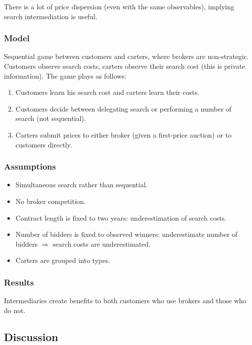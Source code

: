 There is a lot of price dispersion (even with the same observables), implying search intermediation is useful.

\subsubsection{Model}

Sequential game between customers and carters, where brokers are non-strategic. Customers observe search costs, carters observe their search cost (this is private information). The game plays as follows:\begin{enumerate}
\item Customers learn his search cost and carters learn their costs.
\item Customers decide between delegating search or performing a number of search (not sequential).
\item Carters submit prices to either broker (given a first-price auction) or to customers directly.
\end{enumerate}

\subsubsection{Assumptions}

\begin{itemize}
\item Simultaneous search rather than sequential.
\item No broker competition.
\item Contract length is fixed to two years: underestimation of search costs.
\item Number of bidders is fixed to observed winners: underestimate number of bidders $\Rightarrow$ search costs are underestimated.
\item Carters are grouped into types.
\end{itemize}

\subsubsection{Results}

Intermediaries create benefits to both customers who use brokers and those who do not. 

\subsection{Discussion}

